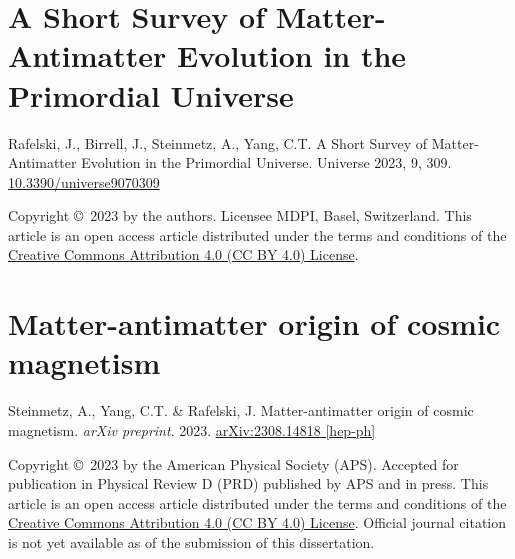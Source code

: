 \chapter{A Short Survey of Matter-Antimatter Evolution in the Primordial Universe}
\label{appendixE}
\begin{center}
Rafelski, J., Birrell, J., Steinmetz, A., Yang, C.T. A Short Survey of Matter-Antimatter Evolution in the Primordial Universe. Universe 2023, 9, 309. \href{https://doi.org/10.3390/universe9070309}{10.3390/universe9070309}
\end{center}

\noindent Copyright \copyright\ 2023 by the authors. Licensee MDPI, Basel, Switzerland. This article is an open access article distributed under the terms and conditions of the \href{https://creativecommons.org/licenses/by/4.0/}{Creative Commons Attribution 4.0 (CC BY 4.0) License}.

%

\chapter{Matter-antimatter origin of cosmic magnetism}
\label{appendixF}
\begin{center}
Steinmetz, A., Yang, C.T. \& Rafelski, J. Matter-antimatter origin of cosmic magnetism. \emph{arXiv preprint}. 2023. \href{https://arxiv.org/abs/2308.14818}{arXiv:2308.14818 [hep-ph]}
\end{center}

\noindent Copyright \copyright\ 2023 by the American Physical Society (APS). Accepted for publication in Physical Review D (PRD) published by APS and in press. This article is an open access article distributed under the terms and conditions of the \href{https://creativecommons.org/licenses/by/4.0/}{Creative Commons Attribution 4.0 (CC BY 4.0) License}. Official journal citation is not yet available as of the submission of this dissertation.

%
